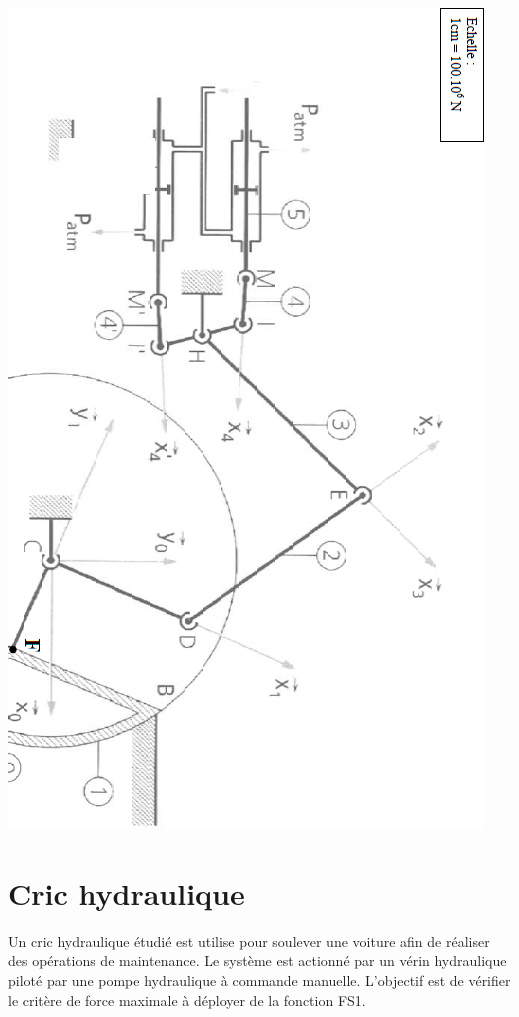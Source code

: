 \documentclass[11pt,oneside]{article}
\begin{document}
\begin{center}
\includegraphics[height=.9\textheight]{png/img6.png}
\end{center}

\section*{Cric hydraulique}
\setcounter{paragraph}{0}
Un cric hydraulique étudié est utilise pour soulever une voiture afin de réaliser des opérations de maintenance. Le système est actionné par un vérin hydraulique piloté par une pompe hydraulique à commande manuelle. L'objectif est de vérifier le critère de force maximale à déployer de la fonction FS1. 
\end{document}
